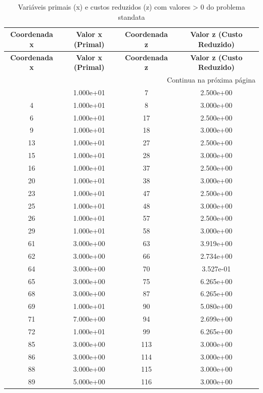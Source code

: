 \documentclass[12pt]{article}
\begin{document}
\begin{longtable}{@{}cccc@{}}
\caption{Variáveis primais (x) e custos reduzidos (z) com valores > 0 do problema standata} \\
\toprule
\textbf{Coordenada x} & \textbf{Valor x (Primal)} & \textbf{Coordenada z} & \textbf{Valor z (Custo Reduzido)} \\
\midrule
\endfirsthead

\toprule
\textbf{Coordenada x} & \textbf{Valor x (Primal)} & \textbf{Coordenada z} & \textbf{Valor z (Custo Reduzido)} \\
\midrule
\endhead

\midrule \multicolumn{4}{r}{{Continua na próxima página}} \\ \midrule
\endfoot

\bottomrule
\endlastfoot
3 & 1.000e+01 & 7 & 2.500e+00 \\
4 & 1.000e+01 & 8 & 3.000e+00 \\
6 & 1.000e+01 & 17 & 2.500e+00 \\
9 & 1.000e+01 & 18 & 3.000e+00 \\
13 & 1.000e+01 & 27 & 2.500e+00 \\
15 & 1.000e+01 & 28 & 3.000e+00 \\
16 & 1.000e+01 & 37 & 2.500e+00 \\
20 & 1.000e+01 & 38 & 3.000e+00 \\
23 & 1.000e+01 & 47 & 2.500e+00 \\
25 & 1.000e+01 & 48 & 3.000e+00 \\
26 & 1.000e+01 & 57 & 2.500e+00 \\
29 & 1.000e+01 & 58 & 3.000e+00 \\
61 & 3.000e+00 & 63 & 3.919e+00 \\
62 & 3.000e+00 & 66 & 2.734e+00 \\
64 & 3.000e+00 & 70 & 3.527e-01 \\
65 & 3.000e+00 & 75 & 6.265e+00 \\
68 & 3.000e+00 & 87 & 6.265e+00 \\
69 & 1.000e+01 & 90 & 5.080e+00 \\
71 & 7.000e+00 & 94 & 2.699e+00 \\
72 & 1.000e+01 & 99 & 6.265e+00 \\
85 & 3.000e+00 & 113 & 3.000e+00 \\
86 & 3.000e+00 & 114 & 3.000e+00 \\
88 & 3.000e+00 & 115 & 3.000e+00 \\
89 & 5.000e+00 & 116 & 3.000e+00 \\

\end{longtable}
\end{document}
